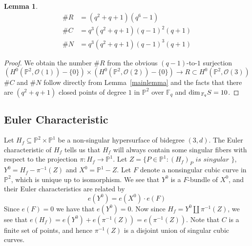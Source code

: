 \documentclass[12pt]{article}
\theoremstyle{plain}
\newtheorem{lemma}[equation]{Lemma}
\theoremstyle{definition}
\newcommand{\IF}{\mathbb{F}}
\newcommand{\IP}{\mathbb{P}}
\newcommand{\sO}{\mathcal{O}}
\renewcommand\dim{{\rm dim\,}}
\newcommand{\<}{\langle}
\renewcommand{\>}{\rangle}
\begin{document}
\begin{lemma}
\begin{align*}
\# R &= (q^2 + q + 1)(q^6 - 1)\\
\# C &= q^3 (q^2 + q + 1) (q - 1)^2 (q + 1) \\
\# N &= q^3 (q^2 + q + 1) (q - 1)^3 (q + 1)
\end{align*}
\end{lemma}
\begin{proof}
We obtain the number $\# R$ from the obvious $(q - 1)$-to-$1$ surjection 
$$ (H^0(\IP^2, \sO(1)) - \{ 0 \}) \times (H^0(\IP^2, \sO(2)) - \{ 0 \}) \to R \subset H^0(\IP^2, \sO(3))$$
$\# C$ and $\# N$ follow directly from Lemma~\ref{mainlemma} and the facts that there are $(q^2 + q + 1)$ closed points of degree $1$ in $\IP^2$ over $\IF_q$ and $\dim_{\IF_q} S = 10$. 
\end{proof}

\subsection{Euler Characteristic}
Let $H_f \subseteq \IP^2 \times \IP^1$ be a non-singular hypersurface of bidegree $(3, d)$.  The Euler characteristic of $H_f$ tells us that $H_f$ will always contain some singular fibers with respect to the projection $\pi : H_f \to \IP^1$. Let $Z = \{ P \in \IP^1 : (H_f)_P \textit{ is singular }\}$, $Y^0 = H_f - \pi^{-1}(Z)$ and $X^0 = \IP^1 - Z$. Let $F$ denote a nonsingular cubic curve in $\IP^2$, which is unique up to isomorphism. We see that $Y^0$ is a $F$-bundle of $X^0$, and their Euler characteristics are related by 
$$ e(Y^0) = e(X^0 ) \cdot e(F) $$ 
Since $e(F) = 0$ we have that $e(Y^0) = 0$. Now since $H_f = Y^0 \coprod \pi^{-1}(Z)$, we see that $e(H_f) = e(Y^0) + e(\pi^{-1}(Z)) = e(\pi^{-1}(Z))$. Note that $C$ is a finite set of points, and hence $\pi^{-1} (Z)$ is a disjoint union of singular cubic curves. 
\end{document}
